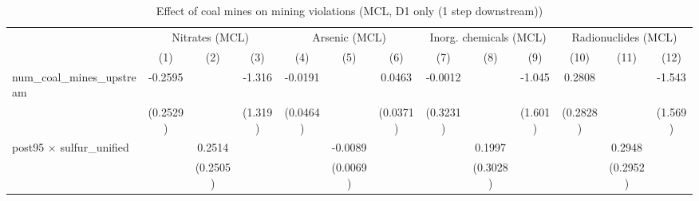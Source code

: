 
\begin{table}[htbp]
   
   \caption{\label{2sls_4step_d1_minevio_mcl} Effect of coal mines on mining violations (MCL, D1 only (1 step downstream))}
   \bigskip
   
   \centering
   
   \begin{adjustbox}{width = \textwidth, center}
      
      
      \begin{tabular}{lcccccccccccc}
         \toprule
         
          & \multicolumn{3}{c}{Nitrates (MCL)} & \multicolumn{3}{c}{Arsenic (MCL)} & \multicolumn{3}{c}{Inorg. chemicals (MCL)} & \multicolumn{3}{c}{Radionuclides (MCL)}\\
         
                                                           & (1)           & (2)           & (3)           & (4)           & (5)                   & (6)                   & (7)                   & (8)           & (9)           & (10)          & (11)          & (12)\\  
         
         \midrule 
         num\_coal\_mines\_upstream                        & -0.2595       &               & -1.316        & -0.0191       &                       & 0.0463                & -0.0012               &               & -1.045        & 0.2808        &               & -1.543\\   
                                                           & (0.2529)      &               & (1.319)       & (0.0464)      &                       & (0.0371)              & (0.3231)              &               & (1.601)       & (0.2828)      &               & (1.569)\\   
         post95 $\times$ sulfur\_unified                   &               & 0.2514        &               &               & -0.0089               &                       &                       & 0.1997        &               &               & 0.2948        &   \\   
                                                           &               & (0.2505)      &               &               & (0.0069)              &                       &                       & (0.3028)      &               &               & (0.2952)      &   \\   
         

\end{tabular}
\end{adjustbox}
\end{table}
